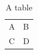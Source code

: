 \documentclass{article}
\begin{document}
\begin{table}
\caption{A table}
\begin{tabular}{ll}
A & B\\
C & D\\
\end{tabular}
\end{table}
\end{document}
